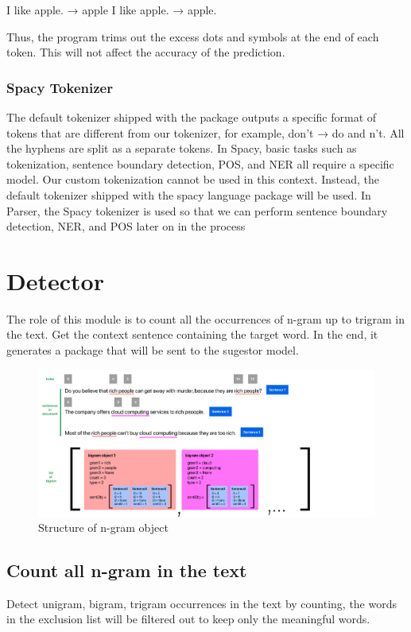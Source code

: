 \documentclass[12pt,oneside,openright,a4paper]{cpe-english-project}
\begin{document}
I like apple. → apple 
I like apple. → apple.

Thus, the program trims out the excess dots and symbols at the end of each token. This will not affect the accuracy of the prediction.

\subsubsection{Spacy Tokenizer}
The default tokenizer shipped with the package outputs a specific format of tokens that are different from our tokenizer, for example, don’t → do and n’t. All the hyphens are split as a separate tokens. In Spacy, basic tasks such as tokenization, sentence boundary detection, POS, and NER all require a specific model. Our custom tokenization cannot be used in this context. Instead, the default tokenizer shipped with the spacy language package will be used. In Parser, the Spacy tokenizer is used so that we can perform sentence boundary detection, NER, and POS later on in the process


\section{Detector}
The role of this module is to count all the occurrences of n-gram up to trigram in the text. Get the context sentence containing the target word. In the end, it generates a package that will be sent to the sugestor model.
\begin{figure}[!h]\centering
\includegraphics[width=15cm]{./img/chp3/Frame 13.png}
\caption{Structure of n-gram object}\label{fig:list of ngram object}
\end{figure}
\subsection{Count all n-gram in the text}
Detect unigram, bigram, trigram occurrences in the text by counting, the words in the exclusion list will be filtered out to keep only the meaningful words.
\end{document}
